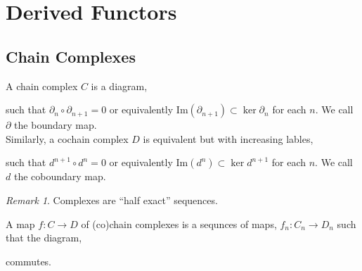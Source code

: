 \documentclass[12pt]{article}
\renewcommand{\Im}[1]{\mathrm{Im}(#1)}
\theoremstyle{remark}
\newtheorem*{remark}{Remark}
\theoremstyle{definition}
\newenvironment{definition}[1][Definition:]{\begin{trivlist}
\item[\hskip \labelsep {\bfseries #1}]}{\end{trivlist}}
\begin{document}
\section{Derived Functors}

\subsection{Chain Complexes}

\newcommand{\Ch}[1]{\mathbf{Ch}\left( #1 \right)}

\begin{definition}
A chain complex $C$ is a diagram,
\begin{center}
\end{center}
such that $\partial_{n} \circ \partial_{n+1} = 0$ or equivalently $\Im{\partial_{n+1}} \subset \ker{\partial_{n}}$ for each $n$. We call $\partial$ the boundary map.
\bigskip\\
Similarly, a cochain complex $D$ is equivalent but with increasing lables, 
\begin{center}
\end{center}
such that $d^{n+1} \circ d^{n} = 0$ or equivalently $\Im{d^n} \subset \ker{d^{n+1}}$ for each $n$. We call $d$ the coboundary map.
\end{definition}

\begin{remark}
Complexes are ``half exact'' sequences. 
\end{remark}

\begin{definition}
A map $f : C \to D$ of (co)chain complexes is a sequnces of maps, $f_n : C_n \to D_n$ such that the diagram,
\begin{center}
\end{center}
commutes.
\end{definition}
\end{document}
